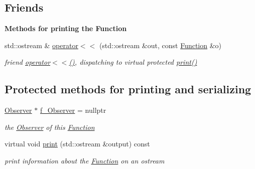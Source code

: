 \subsection*{Friends}
\begin{Indent}\textbf{ Methods for printing the Function}\par
\begin{DoxyCompactItemize}
\item 
std\+::ostream \& \mbox{\hyperlink{class_s_m_spp__di__unipi__it_1_1_function_a23b20b49c11a8fd6f9d37944f073acf2}{operator$<$$<$}} (std\+::ostream \&out, const \mbox{\hyperlink{class_s_m_spp__di__unipi__it_1_1_function}{Function}} \&o)
\begin{DoxyCompactList}\small\item\em friend \mbox{\hyperlink{class_s_m_spp__di__unipi__it_1_1_function_a23b20b49c11a8fd6f9d37944f073acf2}{operator$<$$<$()}}, dispatching to virtual protected \mbox{\hyperlink{class_s_m_spp__di__unipi__it_1_1_function_a2e7b9c9148a98c5c342e8c25cac95926}{print()}} \end{DoxyCompactList}\end{DoxyCompactItemize}
\end{Indent}
\subsection*{Protected methods for printing and serializing}
\begin{DoxyCompactItemize}
\item 
\mbox{\label{class_s_m_spp__di__unipi__it_1_1_function_a90c3f17bb237c6076cf1a4c1babe335d}} 
\mbox{\hyperlink{class_s_m_spp__di__unipi__it_1_1_observer}{Observer}} $\ast$ \mbox{\hyperlink{class_s_m_spp__di__unipi__it_1_1_function_a90c3f17bb237c6076cf1a4c1babe335d}{f\+\_\+\+Observer}} = nullptr
\begin{DoxyCompactList}\small\item\em the \mbox{\hyperlink{class_s_m_spp__di__unipi__it_1_1_observer}{Observer}} of this \mbox{\hyperlink{class_s_m_spp__di__unipi__it_1_1_function}{Function}} \end{DoxyCompactList}\item 
virtual void \mbox{\hyperlink{class_s_m_spp__di__unipi__it_1_1_function_a2e7b9c9148a98c5c342e8c25cac95926}{print}} (std\+::ostream \&output) const
\begin{DoxyCompactList}\small\item\em print information about the \mbox{\hyperlink{class_s_m_spp__di__unipi__it_1_1_function}{Function}} on an ostream \end{DoxyCompactList}\end{DoxyCompactItemize}


